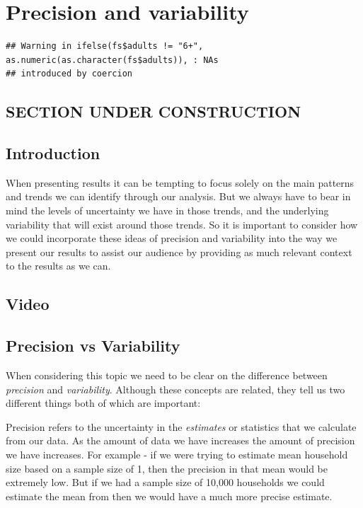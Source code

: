 \documentclass[
]{book}
\begin{document}
\hypertarget{precision}{%
\chapter{Precision and variability}\label{precision}}

\begin{verbatim}
## Warning in ifelse(fs$adults != "6+", as.numeric(as.character(fs$adults)), : NAs
## introduced by coercion
\end{verbatim}

\hypertarget{section-under-construction}{%
\section{SECTION UNDER CONSTRUCTION}\label{section-under-construction}}

\hypertarget{introduction-2}{%
\section{Introduction}\label{introduction-2}}

When presenting results it can be tempting to focus solely on the main patterns and trends we can identify through our analysis. But we always have to bear in mind the levels of uncertainty we have in those trends, and the underlying variability that will exist around those trends. So it is important to consider how we could incorporate these ideas of precision and variability into the way we present our results to assist our audience by providing as much relevant context to the results as we can.

\hypertarget{video-2}{%
\section{Video}\label{video-2}}

\hypertarget{precision-vs-variability}{%
\section{Precision vs Variability}\label{precision-vs-variability}}

When considering this topic we need to be clear on the difference between \emph{precision} and \emph{variability}. Although these concepts are related, they tell us two different things both of which are important:

Precision refers to the uncertainty in the \emph{estimates} or statistics that we calculate from our data. As the amount of data we have increases the amount of precision we have increases. For example - if we were trying to estimate mean household size based on a sample size of 1, then the precision in that mean would be extremely low. But if we had a sample size of 10,000 households we could estimate the mean from then we would have a much more precise estimate.
\end{document}
